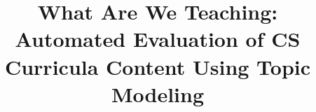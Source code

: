 \documentclass{sig-alternate}
\begin{document}
%

\title{What Are We Teaching: Automated Evaluation of CS Curricula Content Using Topic Modeling}


\maketitle







%
\end{document}
